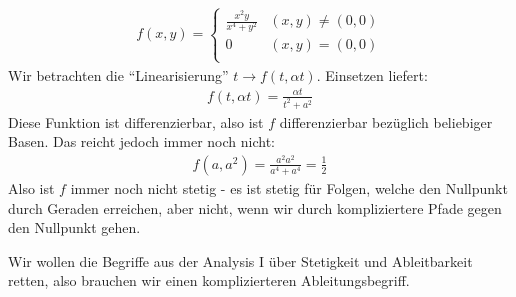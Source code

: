 \documentclass{report}
\newcommand*{\newpar}{\par\vspace{\baselineskip}\noindent}
\begin{document}
\begin{beispiel}
 \begin{align*}
  f(x,y) = \begin{cases}
            \frac{x^2y}{x^4 + y^2} & (x,y) \neq (0,0)\\
            0 & (x,y) = (0,0)\\
           \end{cases}
 \end{align*}
 Wir betrachten die ``Linearisierung'' $t \to f(t, \alpha t)$. Einsetzen liefert:
 \begin{align*}
  f(t, \alpha t) = \frac{\alpha t}{t^2 + a^2}
 \end{align*}
 Diese Funktion ist differenzierbar, also ist $f$ differenzierbar bezüglich beliebiger Basen. Das reicht jedoch immer noch nicht:
 \begin{align*}
  f(a, a^2) = \frac{a^2a^2}{a^4+a^4} = \frac{1}{2}
 \end{align*}
 Also ist $f$ immer noch nicht stetig - es ist stetig für Folgen, welche den Nullpunkt durch Geraden erreichen, aber nicht, wenn wir durch kompliziertere Pfade gegen den Nullpunkt gehen.
\end{beispiel}
\newpar
Wir wollen die Begriffe aus der Analysis I über Stetigkeit und Ableitbarkeit retten, also brauchen wir einen komplizierteren Ableitungsbegriff.
\end{document}
